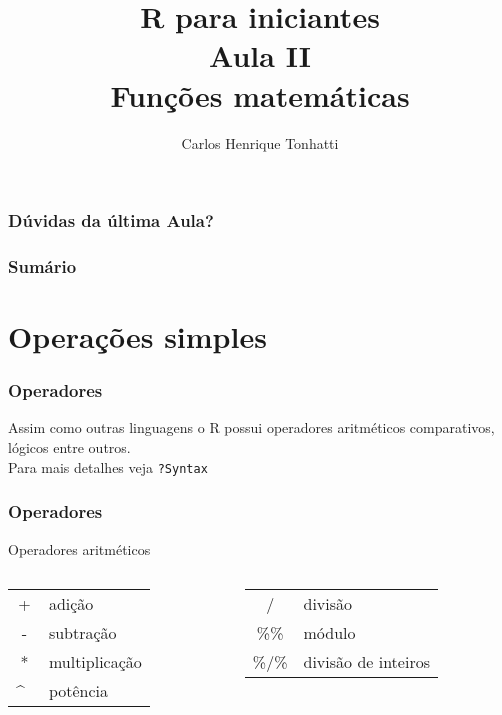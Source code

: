 \documentclass{beamer}
\title[Linguagem R]{R para iniciantes\\ Aula II \\ Funções matemáticas}
\author {Carlos Henrique Tonhatti}
\date{}
\begin{document}
\frame{\titlepage} %

\begin{frame}
  \frametitle{Dúvidas da última Aula?}
\end{frame}

\begin{frame}
 \frametitle{Sumário}
 \tableofcontents[pausesections]
  \setcounter{tocdepth}{2}%
\end{frame}



\section{Operações simples}
\begin{frame}
  \frametitle{Operadores}
    Assim como outras linguagens o R possui operadores aritméticos  comparativos, lógicos entre outros. 
\pause \\
 Para mais detalhes veja \texttt{?Syntax}
\end{frame}
\begin{frame}
  \begin{center}
  \frametitle{Operadores}
    \begin{block}{Operadores aritméticos}
      \begin{columns}
        \begin{column}{5cm}
          \begin{tabular}{c l}
            +& adição \\
          -& subtração\\
          * & multiplicação\\
           \^~ & potência \\
         \end{tabular}

        \end{column}

        \begin{column}{5cm}
          \begin{tabular}{c l}
          / & divisão\\
          \%\% &módulo\\
          \%/\% &divisão de inteiros\\
        \end{tabular}
        \end{column}
      \end{columns}
    \end{block}
\end{center}
\end{frame}
\end{document}
